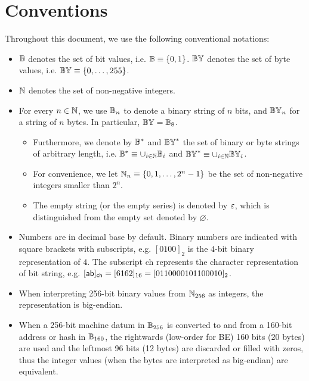 
\section{Conventions}

Throughout this document, we use the following conventional notations:  
\begin{itemize}[nosep]
	\item $\mathbb{B}$ denotes the set of bit values, i.e. $\mathbb{B}\equiv  \{ 0, 1 \} $. 
	$\mathbb{BY}$ denotes the set of byte values, i.e. $\mathbb{BY}\equiv {\left \{{0,\dots,255} \right \}}$.

	\item $\mathbb{N}$ denotes the set of non-negative integers. 


	\item For every $n\in \mathbb{N}$, we use $\mathbb{B}_n$ to denote a binary string of $n$ bits, and $\mathbb{BY}_n$ for a string of $n$ bytes. In particular, $\mathbb{BY}=\mathbb{B}_8$.
	
	\begin{itemize}
		\item Furthermore, we denote by $\mathbb{B}^*$ and $\mathbb{BY}^*$ the set of binary or byte strings of arbitrary length, i.e. $\mathbb{B}^*\equiv \cup_{i\in\mathbb{N}} \mathbb{B}_i$ and $\mathbb{BY}^*\equiv \cup_{i\in\mathbb{N}} \mathbb{BY}_i$. 
	
		\item For convenience, we let $\mathbb{N}_{n}\equiv{\left \{{0,1,\dots, 2^n-1} \right \}}$  be the set of non-negative integers smaller than $2^n$.

		\item The empty string (or the empty series) is denoted by $\mathbb{\varepsilon}$, which is distinguished from the empty set denoted by $\varnothing$.
	\end{itemize}

	\item Numbers are in decimal base by default. Binary numbers are indicated with square brackets with subscripts, e.g. $[0100]_2$ is the $4$-bit binary representation of $4$. The subscript \textsf{ch} represents the character representation of bit string, e.g. $[{\sf ab}]_{\sf ch}=[6162]_{16}=[0110000101100010]_2$.

	\item When interpreting 256-bit binary values from $\mathbb{N}_{256}$ as integers, the representation is big-endian.

	\item When a 256-bit machine datum in $\mathbb{B}_{256}$ is converted to and from a 160-bit address or hash in $\mathbb{B}_{160}$, the rightwards (low-order for BE) 160 bits (20 bytes) are used and the leftmost 96 bits (12 bytes) are discarded or filled with zeros, thus the integer values (when the bytes are interpreted as big-endian) are equivalent.


\end{itemize}
